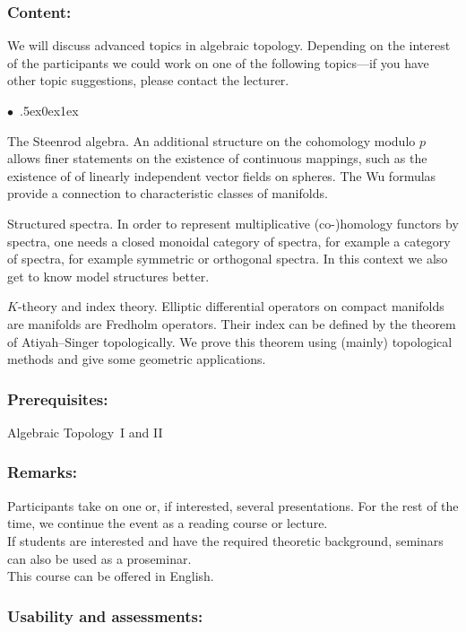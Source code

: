 \documentclass[a4paper,10pt]{article}
\renewenvironment{itemize}{\begin{list}{$\bullet$\ }{\itemsep.5ex\setlength{\topsep}{0.5\itemsep}\parsep0ex\labelsep1ex\settowidth{\labelwidth}{$\bullet$\ }\setlength{\leftmargin}{\labelwidth}\addtolength{\leftmargin}{3ex}\addtolength{\leftmargin}{\labelsep}}}{\end{list}}
\begin{document}
\subsubsection*{\large
    Content:
}
We will discuss advanced topics in algebraic topology.
Depending on the interest of the participants we could work on one of the following topics---if you have other topic suggestions, please contact the lecturer.
\begin{itemize}
\item The Steenrod algebra. An additional structure on the cohomology modulo $p$
allows finer statements on the existence of continuous mappings, such as the existence of of linearly independent vector fields on spheres. The Wu formulas provide a connection to characteristic classes of manifolds.
\item Structured spectra. In order to represent multiplicative (co-)homology functors
by spectra, one needs a closed monoidal category of spectra, for example a category of spectra, for example
symmetric or orthogonal spectra. In this context
we also get to know model structures better.
\item $K$-theory and index theory. Elliptic differential operators on compact manifolds are manifolds are Fredholm operators. Their index can be defined by the theorem of Atiyah--Singer topologically. We prove this theorem using (mainly) topological methods and give some geometric applications.
\end{itemize} 
\subsubsection*{\large
    Prerequisites:
}
Algebraic Topology~I and II
\subsubsection*{\large
    Remarks:
}
Participants take on one or, if interested, several presentations. For the rest of the time, we continue the event as a reading course or lecture. \\ If students are interested and have the required theoretic background, seminars can also be used as a proseminar. \\ This course can be offered in English.
\subsubsection*{\large
    Usability and assessments:
}
\end{document}
